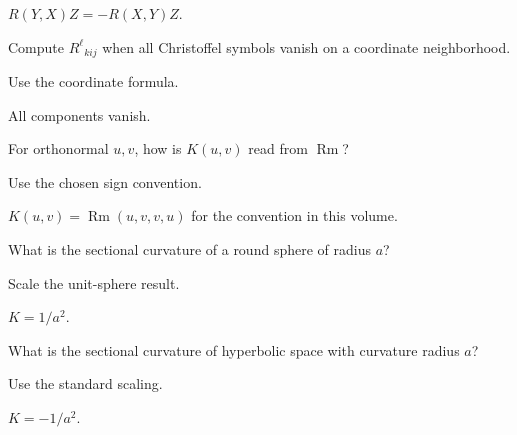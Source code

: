 \begin{solution}
\(R(Y,X)Z=-R(X,Y)Z\).
\end{solution}

\begin{exercise}\label{exr:vii26-ped-02}
Compute \(R^\ell{}_{kij}\) when all Christoffel symbols vanish on a coordinate neighborhood.
\end{exercise}

\begin{hint}
Use the coordinate formula.
\end{hint}

\begin{solution}
All components vanish.
\end{solution}

\begin{exercise}\label{exr:vii26-ped-03}
For orthonormal \(u,v\), how is \(K(u,v)\) read from \(\operatorname{Rm}\)?
\end{exercise}

\begin{hint}
Use the chosen sign convention.
\end{hint}

\begin{solution}
\(K(u,v)=\operatorname{Rm}(u,v,v,u)\) for the convention in this volume.
\end{solution}

\begin{exercise}\label{exr:vii26-ped-04}
What is the sectional curvature of a round sphere of radius \(a\)?
\end{exercise}

\begin{hint}
Scale the unit-sphere result.
\end{hint}

\begin{solution}
\(K=1/a^2\).
\end{solution}

\begin{exercise}\label{exr:vii26-ped-05}
What is the sectional curvature of hyperbolic space with curvature radius \(a\)?
\end{exercise}

\begin{hint}
Use the standard scaling.
\end{hint}

\begin{solution}
\(K=-1/a^2\).
\end{solution}

